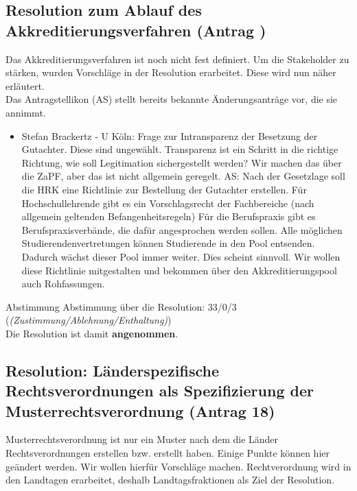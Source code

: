   \subsection{Resolution zum Ablauf des Akkreditierungsverfahren (Antrag )}
    Das Akkreditierungsverfahren ist noch nicht fest definiert. Um die Stakeholder zu stärken, wurden Vorschläge in der Resolution erarbeitet. Diese wird nun näher erläutert. \\
    Das Antragstellikon (AS) stellt bereits bekannte Änderungsanträge vor, die sie annimmt.

    \begin{itemize}
      \item Stefan Brackertz - U Köln: Frage zur Intransparenz der Besetzung der Gutachter. Diese sind ungewählt. Transparenz ist ein Schritt in die richtige Richtung, wie soll Legitimation sichergestellt werden? Wir machen das über die ZaPF, aber das ist nicht allgemein geregelt.
      AS: Nach der Gesetzlage soll die HRK eine Richtlinie zur Bestellung der Gutachter erstellen. Für Hochschullehrende gibt es ein Vorschlagsrecht der Fachbereiche (nach allgemein geltenden Befangenheitsregeln)
      Für die Berufspraxis gibt es Berufspraxisverbände, die dafür angesprochen werden sollen.
      Alle möglichen Studierendenvertretungen können Studierende in den Pool entsenden. Dadurch wächst dieser Pool immer weiter. Dies scheint sinnvoll.
      Wir wollen diese Richtlinie mitgestalten und bekommen über den Akkreditierungspool auch Rohfassungen.
    \end{itemize}

    \begin{success}{Abstimmung}
      Abstimmung über die Resolution: 33/0/3 (\textit{(Zustimmung/Ablehnung/Enthaltung)}) \\
      Die Resolution ist damit \textbf{angenommen}.
    \end{success}

  \subsection{Resolution: Länderspezifische Rechtsverordnungen als Spezifizierung der Musterrechtsverordnung (Antrag 18)}
    Musterrechtsverordnung ist nur ein Muster nach dem die Länder Rechtsverordnungen erstellen bzw. erstellt haben. Einige Punkte können hier geändert werden. Wir wollen hierfür Vorschläge machen.
    Rechtverordnung wird in den Landtagen erarbeitet, deshalb Landtagsfraktionen als Ziel der Resolution. \\

